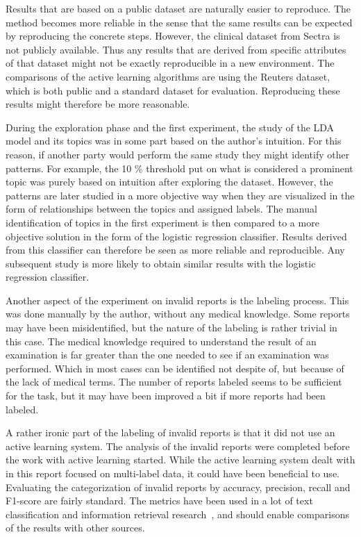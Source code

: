 Results that are based on a public dataset are naturally easier to reproduce.
The method becomes more reliable in the sense that the same results can be expected by reproducing the concrete steps.
However, the clinical dataset from Sectra is not publicly available.
Thus any results that are derived from specific attributes of that dataset might not be exactly reproducible in a new environment.
The comparisons of the active learning algorithms are using the Reuters dataset, which is both public and a standard dataset for evaluation.
Reproducing these results might therefore be more reasonable.

During the exploration phase and the first experiment, the study of the LDA model and its topics was in some part based on the author's intuition.
For this reason, if another party would perform the same study they might identify other patterns.
For example, the 10 \% threshold put on what is considered a prominent topic was purely based on intuition after exploring the dataset.
However, the patterns are later studied in a more objective way when they are visualized in the form of relationships between the topics and assigned labels.
The manual identification of topics in the first experiment is then compared to a more objective solution in the form of the logistic regression classifier.
Results derived from this classifier can therefore be seen as more reliable and reproducible.
Any subsequent study is more likely to obtain similar results with the logistic regression classifier.

Another aspect of the experiment on invalid reports is the labeling process.
This was done manually by the author, without any medical knowledge.
Some reports may have been misidentified, but the nature of the labeling is rather trivial in this case.
The medical knowledge required to understand the result of an examination is far greater than the one needed to see if an examination was performed.
Which in most cases can be identified not despite of, but because of the lack of medical terms.
The number of reports labeled seems to be sufficient for the task, but it may have been improved a bit if more reports had been labeled.

A rather ironic part of the labeling of invalid reports is that it did not use an active learning system.
The analysis of the invalid reports were completed before the work with active learning started.
While the active learning system dealt with in this report focused on multi-label data, it could have been beneficial to use.
Evaluating the categorization of invalid reports by accuracy, precision, recall and F1-score are fairly standard.
The metrics have been used in a lot of text classification and information retrieval research~\cite{aggarwal2012surveyclass, bishop2006pattern}, and should enable comparisons of the results with other sources.

